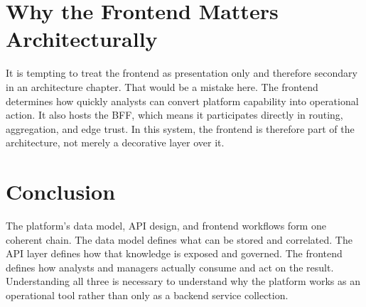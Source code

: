 \section{Why the Frontend Matters Architecturally}
It is tempting to treat the frontend as presentation only and therefore secondary in an architecture chapter. That would be a mistake here. The frontend determines how quickly analysts can convert platform capability into operational action. It also hosts the BFF, which means it participates directly in routing, aggregation, and edge trust. In this system, the frontend is therefore part of the architecture, not merely a decorative layer over it.

\section*{Conclusion}
The platform's data model, API design, and frontend workflows form one coherent chain. The data model defines what can be stored and correlated. The API layer defines how that knowledge is exposed and governed. The frontend defines how analysts and managers actually consume and act on the result. Understanding all three is necessary to understand why the platform works as an operational tool rather than only as a backend service collection.
